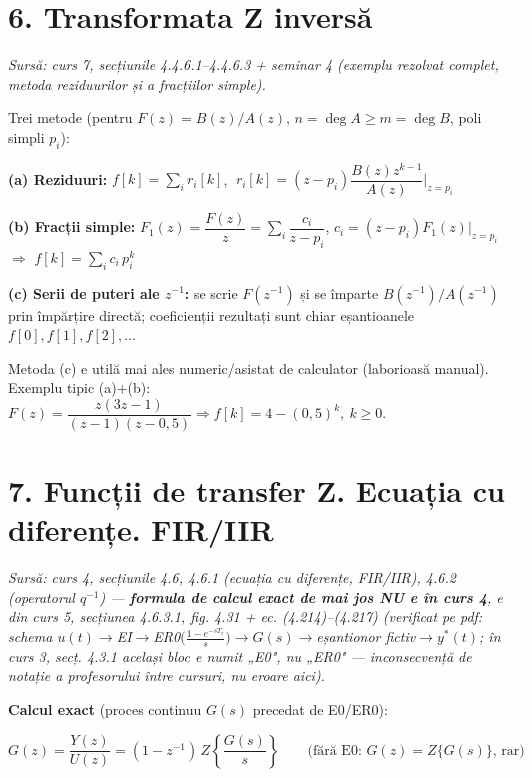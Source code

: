 \documentclass[10pt,a4paper]{article}
\newcommand{\srcnote}[1]{{\footnotesize\color{gray!55!black}\textit{Sursă: #1}}\par}
\begin{document}
\section*{6. Transformata Z inversă}\label{sec:6}
\srcnote{curs 7, secțiunile 4.4.6.1–4.4.6.3 + seminar 4 (exemplu rezolvat complet, metoda reziduurilor și a fracțiilor simple).}
Trei metode (pentru $F(z)=B(z)/A(z)$, $n=\deg A\ge m=\deg B$, poli simpli $p_i$):
\begin{keyeq}\color{red!65!black}
\textbf{(a) Reziduuri:} $f[k]=\sum_i r_i[k]$, $\;r_i[k]=(z-p_i)\dfrac{B(z)z^{k-1}}{A(z)}\Big|_{z=p_i}$

\textbf{(b) Fracții simple:} $F_1(z)=\dfrac{F(z)}{z}=\sum_i\dfrac{c_i}{z-p_i}$, $c_i=(z-p_i)F_1(z)|_{z=p_i}$ $\Rightarrow$ $f[k]=\sum_i c_i\,p_i^k$

\textbf{(c) Serii de puteri ale $z^{-1}$:} se scrie $F(z^{-1})$ și se împarte $B(z^{-1})/A(z^{-1})$ prin împărțire directă; coeficienții rezultați sunt chiar eșantioanele $f[0],f[1],f[2],\dots$
\end{keyeq}
Metoda (c) e utilă mai ales numeric/asistat de calculator (laborioasă manual). Exemplu tipic (a)+(b): $F(z)=\dfrac{z(3z-1)}{(z-1)(z-0{,}5)}\Rightarrow f[k]=4-(0{,}5)^k,\ k\ge0$.

\section*{7. Funcții de transfer Z. Ecuația cu diferențe. FIR/IIR}\label{sec:7}
\srcnote{curs 4, secțiunile 4.6, 4.6.1 (ecuația cu diferențe, FIR/IIR), 4.6.2 (operatorul $q^{-1}$) — \textbf{formula de calcul exact de mai jos NU e în curs 4}, e din curs 5, secțiunea 4.6.3.1, fig. 4.31 + ec. (4.214)–(4.217) (verificat pe pdf: schema $u(t)\to$EI$\to$ER0$\big(\frac{1-e^{-sT_e}}{s}\big)\to G(s)\to$eșantionor fictiv$\to y^*(t)$; în curs 3, secț. 4.3.1 același bloc e numit „E0", nu „ER0" — inconsecvență de notație a profesorului între cursuri, nu eroare aici).}
\textbf{Calcul exact} (proces continuu $G(s)$ precedat de E0/ER0):
\begin{keyeq}\color{red!65!black}
$$G(z)=\dfrac{Y(z)}{U(z)}=(1-z^{-1})\,Z\!\left\{\dfrac{G(s)}{s}\right\}\qquad\text{(fără E0: } G(z)=Z\{G(s)\}\text{, rar)}$$
\end{keyeq}
\end{document}

